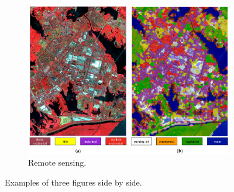 \begin{figure}[h]
\begin{subfigure}[b]{0.3\textwidth}
         \includegraphics[width=\textwidth]{Figures/Introduction/app3.png}
         \caption{Remote sensing.}
         \label{fig:app3}
     \end{subfigure}
\caption{Examples of three figures side by side.}        
\label{fig:applications}
\end{figure}